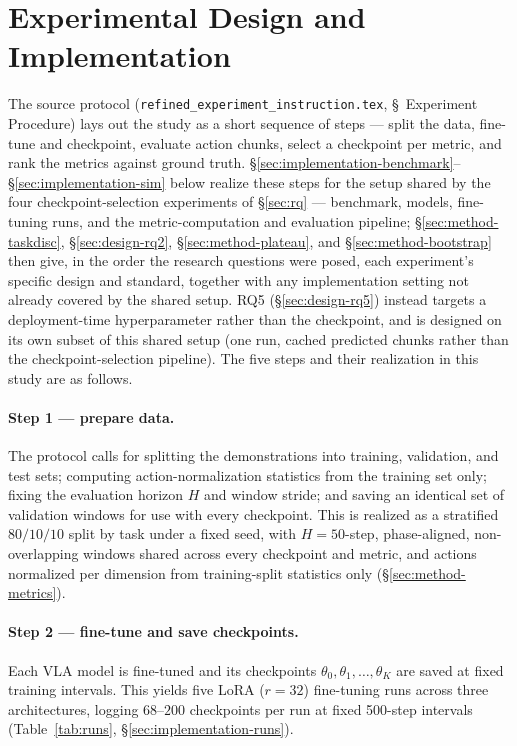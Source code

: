 \documentclass[english,12pt,a4paper,pdftex,elec,utf8]{aaltothesis}
\begin{document}
\clearpage

\section{Experimental Design and Implementation}
\label{sec:implementation}

The source protocol (\texttt{refined\_experiment\_instruction.tex}, \S~Experiment Procedure) lays out the study as a short sequence of steps --- split the data, fine-tune and checkpoint, evaluate action chunks, select a checkpoint per metric, and rank the metrics against ground truth. \S\ref{sec:implementation-benchmark}--\S\ref{sec:implementation-sim} below realize these steps for the setup shared by the four checkpoint-selection experiments of \S\ref{sec:rq} --- benchmark, models, fine-tuning runs, and the metric-computation and evaluation pipeline; \S\ref{sec:method-taskdisc}, \S\ref{sec:design-rq2}, \S\ref{sec:method-plateau}, and \S\ref{sec:method-bootstrap} then give, in the order the research questions were posed, each experiment's specific design and standard, together with any implementation setting not already covered by the shared setup. RQ5 (\S\ref{sec:design-rq5}) instead targets a deployment-time hyperparameter rather than the checkpoint, and is designed on its own subset of this shared setup (one run, cached predicted chunks rather than the checkpoint-selection pipeline). The five steps and their realization in this study are as follows.

\paragraph{Step 1 --- prepare data.} The protocol calls for splitting the demonstrations into training, validation, and test sets; computing action-normalization statistics from the training set only; fixing the evaluation horizon $H$ and window stride; and saving an identical set of validation windows for use with every checkpoint. This is realized as a stratified $80/10/10$ split by task under a fixed seed, with $H{=}50$-step, phase-aligned, non-overlapping windows shared across every checkpoint and metric, and actions normalized per dimension from training-split statistics only (\S\ref{sec:method-metrics}).

\paragraph{Step 2 --- fine-tune and save checkpoints.} Each VLA model is fine-tuned and its checkpoints $\theta_0,\theta_1,\ldots,\theta_K$ are saved at fixed training intervals. This yields five LoRA ($r{=}32$) fine-tuning runs across three architectures, logging $68$--$200$ checkpoints per run at fixed 500-step intervals (Table~\ref{tab:runs}, \S\ref{sec:implementation-runs}).
\end{document}
